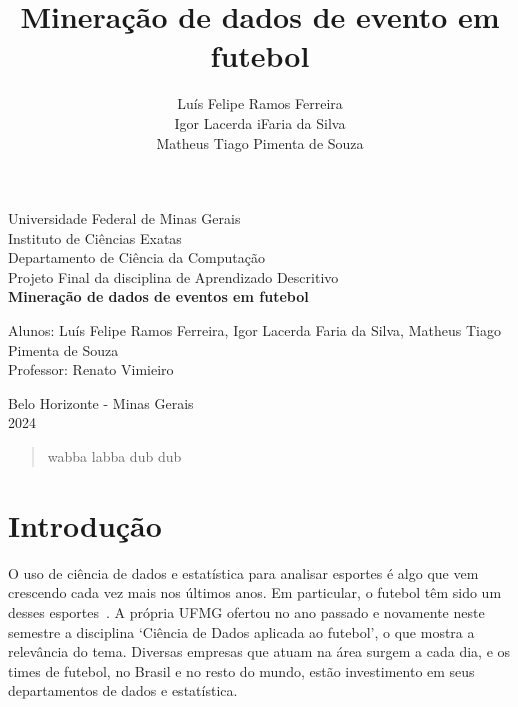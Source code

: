 \documentclass{article}
\begin{document}
\begin{titlepage}
    \begin{center}
        {\large Universidade Federal de Minas Gerais}\\[0.2cm]
        {\large Instituto de Ciências Exatas}\\[0.2cm]
        {\large Departamento de Ciência da Computação}\\[0.2cm]
        {\large Projeto Final da disciplina de Aprendizado Descritivo}\\[5.1cm]
        {\large \bf Mineração de dados de eventos em futebol}\\[5.1cm]
    \end{center}
    {\large Alunos: Luís Felipe Ramos Ferreira, Igor Lacerda Faria da Silva,
    Matheus Tiago Pimenta de Souza}\\[0.7cm]
    {\large Professor: Renato Vimieiro}\\[5.1cm]
    \begin{center}
        {\large Belo Horizonte - Minas Gerais}\\[0.2cm]
        {\large 2024}
    \end{center}
\end{titlepage}

\newpage
\begin{quote}
    wabba labba dub dub
\end{quote}

\newpage
\renewcommand{\contentsname}{Sumário}
\tableofcontents
\newpage

\title{Mineração de dados de evento em futebol}
\author{Luís Felipe Ramos Ferreira \\  Igor Lacerda iFaria da Silva \\ Matheus
    Tiago Pimenta de Souza}

\maketitle

\section{Introdução}

O uso de ciência de dados e estatística para analisar esportes é algo que vem
crescendo cada vez mais nos últimos anos. Em
particular, o futebol têm sido um desses
esportes~\cite{takvorian2021beautiful}. A própria UFMG ofertou no
ano passado e novamente neste semestre a disciplina `Ciência de Dados aplicada
ao futebol', o que mostra a relevância do tema. Diversas empresas que atuam na
área surgem a cada dia, e os times de futebol, no Brasil e no resto do
mundo, estão investimento em seus departamentos de dados e estatística.
\end{document}
